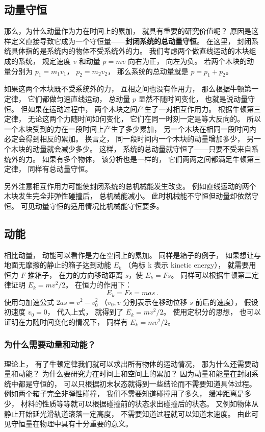 \subsection{动量守恒}
那么，为什么动量作为力在时间上的累加， 就具有重要的研究价值呢？ 原因是这样定义直接导致它成为一个守恒量——\textbf{封闭系统的总动量守恒}。 在这里， 封闭系统具体指的是系统内的物体不受系统外的力。 我们考虑两个做直线运动的木块组成的系统， 规定速度 $v$ 和动量 $p = mv$ 向右为正， 向左为负。 若两个木块的动量分别为 $p_1 = m_1 v_1$， $p_2 = m_2 v_2$， 那么系统的总动量就是 $p = p_1 + p_2$。

如果这两个木块既不受系统外的力， 互相之间也没有作用力， 那么根据牛顿第一定律， 它们都做匀速直线运动， 总动量 $p$ 显然不随时间变化， 也就是说动量守恒。 但如果在运动过程中， 两个木块之间产生了一对相互作用力。 根据牛顿第三定律， 无论这两个力随时间如何变化， 它们在同一时刻一定是等大反向的。 所以一个木块受到的力在一段时间上产生了多少累加， 另一个木块在相同一段时间内必定会得到相反的累加。 换言之， 同一段时间内一个木块的动量增加多少， 另一个木块的动量就会减少多少。 这样， 系统的总动量就守恒了——只要不受来自系统外的力。 如果有多个物体， 该分析也是一样的， 它们两两之间都满足牛顿第三定律， 同样有总动量守恒。

另外注意相互作用力可能使封闭系统的总机械能发生改变。 例如直线运动的两个木块发生完全非弹性碰撞后， 总机械能减小。 此时机械能不守恒但动量却依然守恒。 可见动量守恒的适用情况比机械能守恒要多。

\subsection{动能}
相比动量， 动能可以看作是力在空间上的累加。 同样是箱子的例子， 如果想让与地面无摩擦的静止的箱子达到动能 $E_k$ （角标 k 表示 kinetic energy）， 就需要用恒力 $F$ 推箱子， 在力的方向移动距离 $s$，使 $E_k = Fs$。 同样可以根据牛顿第二定律证明 $E_k = mv^2/2$。 在恒力的作用下：
\begin{equation}
E_k = Fs = mas~.
\end{equation}
使用匀加速公式 $2as = v^2 - v_0^2$ （$v_0, v$ 分别表示在移动位移 $s$ 前后的速度）， 假设初速度 $v_0 = 0$， 代入上式， 就得到了 $E_k = mv^2/2$。 使用定积分的思想， 也可以证明在力随时间变化的情况下， 同样有 $E_k = mv^2/2$。

\subsubsection{为什么需要动量和动能？}
理论上， 有了牛顿定律我们就可以求出所有物体的运动情况， 那为什么还需要动量和动能？ 为什么要研究力在时间上和空间上的累加？ 因为动量和能量在封闭系统中都是守恒的， 可以只根据初末状态就得到一些结论而不需要知道具体过程。 例如两个箱子完全非弹性碰撞， 我们不需要知道碰撞用了多久， 缓冲距离是多少， 材料的性质等等就可以根据碰撞前的状态求出碰撞后的状态。 又例如物体从静止开始延光滑轨道滚落一定高度， 不需要知道过程就可以知道末速度。 由此可见守恒量在物理中具有十分重要的意义。

